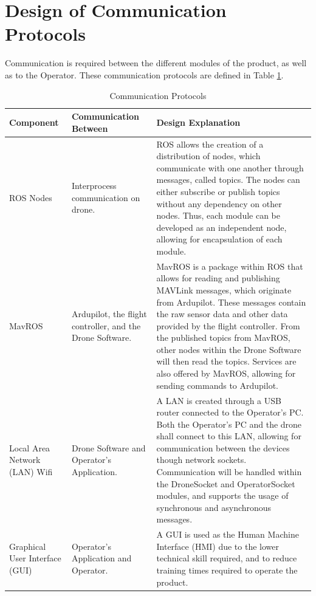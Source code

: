 \documentclass[12pt, titlepage]{article}
\begin{document}
\clearpage

\section{Design of Communication Protocols}
\label{sec:commProtocols}

Communication is required between the different modules of the product, as well as to the Operator. These communication protocols are defined in Table \ref{tab:commProtocols}.

\begin{table}[!h]
\begin{center}
\caption {Communication Protocols}
\label{tab:commProtocols}
\begin{tabular}{ | m{2.7cm} | m{4.5cm} | m{7.8cm} | } 
\hline
Component & Communication Between & Design Explanation \\
\hline
ROS Nodes & Interprocess communication on drone. &
    ROS allows the creation of a distribution of nodes, which communicate with one another through messages, called topics. The nodes can either subscribe or publish topics without any dependency on other nodes. Thus, each module can be developed as an independent node, allowing for encapsulation of each module. \\
\hline
MavROS & Ardupilot, the flight controller, and the Drone Software. &
    MavROS is a package within ROS that allows for reading and publishing MAVLink messages, which originate from Ardupilot. These messages contain the raw sensor data and other data provided by the flight controller. From the published topics from MavROS, other nodes within the Drone Software will then read the topics. Services are also offered by MavROS, allowing for sending commands to Ardupilot. \\
\hline
Local Area Network (LAN) Wifi & Drone Software and Operator's Application. &
    A LAN is created through a USB router connected to the Operator's PC. Both the Operator's PC and the drone shall connect to this LAN, allowing for communication between the devices though network sockets. Communication will be handled within the DroneSocket and OperatorSocket modules, and supports the usage of synchronous and asynchronous messages. \\
\hline
Graphical User Interface (GUI) & Operator's Application and Operator. &
    A GUI is used as the Human Machine Interface (HMI) due to the lower technical skill required, and to reduce training times required to operate the product. \\
\hline
\end{tabular}
\end{center}
\end{table}
\end{document}
